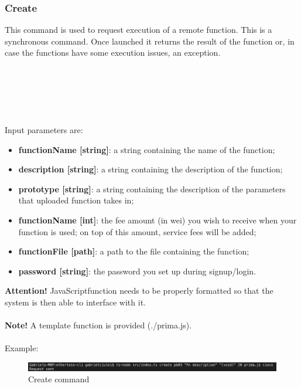 \subsubsection{Create}
This command is used to request execution of a remote function. This is a synchronous command. Once launched it returns the result of the function or, in case the functions have some execution issues, an exception.\\\\
\centerline{}\\\\
\\\\
Input parameters are:
\begin{itemize}
	\item \textbf{functionName [string]}: a string containing the name of the function;
	\item \textbf{description [string]}: a string containing the description of the function;
	\item \textbf{prototype [string]}: a string containing the description of the parameters that uploaded function takes in;
	\item \textbf{functionName [int]}: the fee amount (in wei) you wish to receive when your function is used; on top of this amount, service fees will be added;
	\item \textbf{functionFile [path]}: a path to the file containing the function;
	\item \textbf{password [string]}: the password you set up during signup/login.
\end{itemize}
\textbf{Attention!} JavaScript\glo function needs to be properly formatted so that the system is then able to interface with it.\\\\
\textbf{Note!} A template function is provided (./prima.js).\\\\
Example:
\begin{figure}[h]
	\centering
	\includegraphics[width=\textwidth]{res/img/Screenshot_deploy.png}
	\caption{Create command}
\end{figure}
